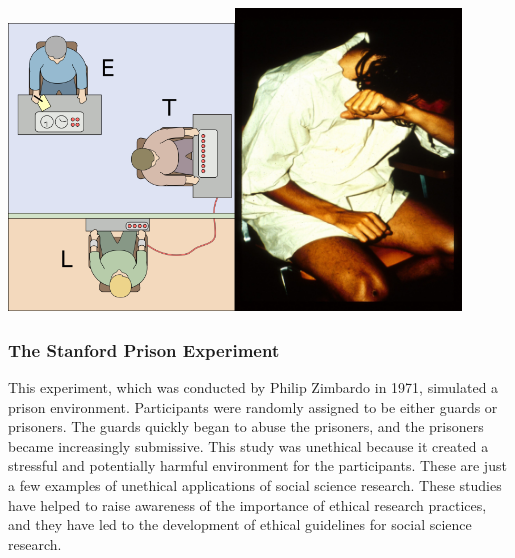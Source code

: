 \documentclass[
  b5paper]{book}
\begin{document}
\hypertarget{the-milgram-experimentsthe-stanford-prison-experiment}{%
\subsubsection*{\texorpdfstring{\protect\includegraphics[width=0.45\textwidth,height=\textheight]{images/Milgram_experiment.png}\protect\includegraphics[width=0.45\textwidth,height=\textheight]{images/prisoner-breaks-down.png}}{The Milgram ExperimentsThe Stanford Prison Experiment}}\label{the-milgram-experimentsthe-stanford-prison-experiment}}

\hypertarget{the-stanford-prison-experiment}{%
\subsubsection*{The Stanford Prison Experiment}\label{the-stanford-prison-experiment}}

This experiment, which was conducted by Philip Zimbardo in 1971, simulated a prison environment. Participants were randomly assigned to be either guards or prisoners. The guards quickly began to abuse the prisoners, and the prisoners became increasingly submissive. This study was unethical because it created a stressful and potentially harmful environment for the participants. These are just a few examples of unethical applications of social science research. These studies have helped to raise awareness of the importance of ethical research practices, and they have led to the development of ethical guidelines for social science research.
\end{document}
